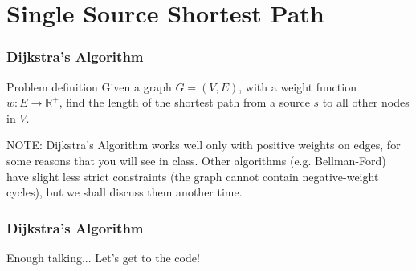 \documentclass{beamer}
\begin{document}
  \section{Single Source Shortest Path}
  \begin{frame}
  \frametitle{Dijkstra's Algorithm}
    \begin{block}{Problem definition}
      Given a graph $G=(V,E)$, with a weight function $w:E\rightarrow \mathbb{R} ^+$, 
      find the length of the shortest path from a source $s$ to all other nodes in $V$.
    \end{block}

    \alert{NOTE:} Dijkstra's Algorithm works well only with positive weights on edges, for some reasons that
    you will see in class. Other algorithms (e.g. Bellman-Ford) have slight less strict constraints (the graph cannot contain negative-weight cycles),
    but we shall discuss them another time.
  \end{frame}

  \begin{frame}
    \frametitle{Dijkstra's Algorithm}
      \begin{huge}
        \begin{center}
          Enough talking... Let's get to the code!
        \end{center}
      \end{huge}
    \end{frame}
\end{document}
